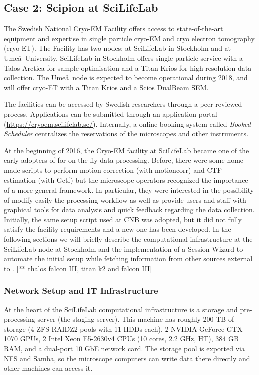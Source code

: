 
\subsection{Case 2: Scipion at SciLifeLab}

The Swedish National Cryo-EM Facility offers access to state-of-the-art equipment and expertise in single particle cryo-EM and cryo electron tomography (cryo-ET). The Facility has two nodes: at SciLifeLab in Stockholm and at Ume\aa\ University. SciLifeLab in Stockholm offers single-particle service with a 
Talos Arctica for sample optimisation and a Titan Krios for high-resolution data collection. The Ume\aa\ node is expected to become operational during 2018, and will offer cryo-ET with a Titan Krios and a Scios DualBeam SEM.

The facilities can be accessed by Swedish researchers through 
a peer-reviewed process. Applications can be submitted through an application portal (\url{https://cryoem.scilifelab.se/}). %
Internally, a online booking system called \emph{Booked Scheduler} centralizes the reservations of the microscopes and other instruments. 

At the beginning of 2016, the Cryo-EM facility at SciLifeLab became one of the early adopters of \scipion for on the fly data processing. Before, there were some home-made scripts to perform motion correction (with motioncorr) and CTF estimation (with Gctf) but the microscope operators recognized the importance of a more general framework. In particular, they were interested in the possibility of modify easily the processing workflow as well as provide users and staff with  graphical tools for data analysis and quick feedback regarding the data collection. Initially, the same setup script used at CNB was adopted, but it did not fully satisfy the facility requirements and a new one has been developed. In the following sections we will briefly describe the computational infrastructure at the SciLifeLab node at Stockholm and the implementation of a Session Wizard to automate the initial setup while fetching information from other sources external to \scipion. 
[** thalos falcon III, titan k2 and falcon III]

\subsubsection{Network Setup and IT Infrastructure}
At the heart of the SciLifeLab computational infrastructure is a storage and pre-processing server (the
staging server). This machine has roughly 200 TB of storage (4 ZFS RAIDZ2 pools
with 11 HDDs each), 2 NVIDIA GeForce GTX 1070 GPUs, 2 Intel Xeon E5-2630v4 CPUs
(10 cores, 2.2 GHz, HT), 384 GB RAM, and a dual-port 10 GbE network card. The
storage pool is exported via NFS and Samba, so the microscope computers can
write data there directly and other machines can access it.

